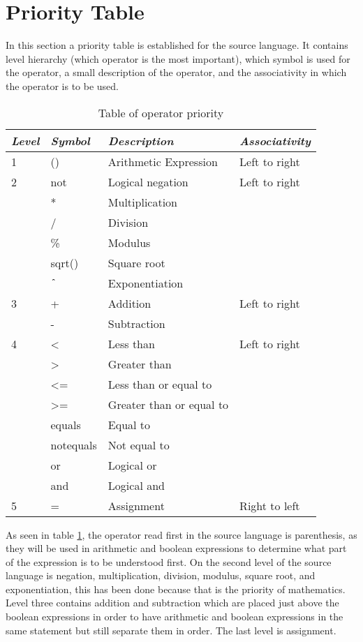\section{Priority Table}
In this section a priority table is established for the source language. It contains level hierarchy (which operator is the most important), which symbol is used for the operator, a small description of the operator, and the associativity in which the operator is to be used.
\begin{table}[H]
	\center
	\begin{tabular}{|l|l|l|l|}
	\hline
	\emph{Level} & \emph{Symbol} & \emph{Description} & \emph{Associativity} \\ 
 		\hline
 		1 & () & Arithmetic Expression & Left to right \\
 		\hline
 		2 & not & Logical negation & Left to right \\
 		& * & Multiplication & \\
 		& / & Division & \\
 		& \% & Modulus & \\
 		& sqrt() & Square root & \\
 		& $\texttt{\^{}}$ & Exponentiation &\\
 		\hline
 		3 & + & Addition & Left to right \\
 		& - & Subtraction & \\
 		\hline
 		4 & <  & Less than & Left to right \\
 		& > & Greater than &  \\
 		& <= & Less than or equal to &  \\
 		& >= & Greater than or equal to &  \\
 		& equals & Equal to &  \\
 		& notequals & Not equal to &  \\
 		& or & Logical or &  \\
 		& and & Logical and &  \\
 		\hline
 		5 & = & Assignment & Right to left \\
 		\hline
	\end{tabular}
	\label{tab:priority}
	\caption{Table of operator priority}
\end{table} 
As seen in table \ref{tab:priority}, the operator read first in the source language is parenthesis, as they will be used in arithmetic and boolean expressions to determine what part of the expression is to be understood first. On the second level of the source language is negation, multiplication, division, modulus, square root, and exponentiation, this has been done because that is the priority of mathematics. Level three contains addition and subtraction which are placed just above the boolean expressions in order to have arithmetic and boolean expressions in the same statement but still separate them in order. The last level is assignment. 